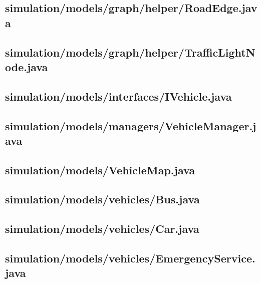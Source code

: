 \subsection{simulation/models/graph/helper/RoadEdge.java}

\newpage
\subsection{simulation/models/graph/helper/TrafficLightNode.java}

\newpage
\subsection{simulation/models/interfaces/IVehicle.java}

\newpage
\subsection{simulation/models/managers/VehicleManager.java}

\newpage
\subsection{simulation/models/VehicleMap.java}

\newpage
\subsection{simulation/models/vehicles/Bus.java}

\newpage
\subsection{simulation/models/vehicles/Car.java}

\newpage
\subsection{simulation/models/vehicles/EmergencyService.java}

\newpage
